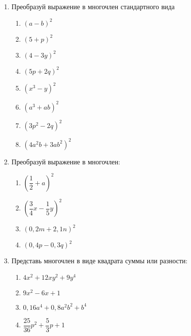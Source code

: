\documentclass[12pt, a4paper]{article}
\begin{document}
	
 \cfoot{}
\begin{enumerate}
	\item Преобразуй выражение в многочлен стандартного вида
	\begin{multicols}{2}
		\begin{enumerate}[label=\textbf{\arabic*)}]
			\item $(a-b)^2$
			\item $(5+p)^2$
			\item $(4-3y)^2$
			\item $(5p+2q)^2$
			\item $(x^3-y)^2$
			\item $(a^3+ab)^2$
			\item $(3p^2-2q)^2$
			\item $(4a^2b+3ab^2)^2$
		\end{enumerate}
	\end{multicols}
	\item Преобразуй выражение в многочлен:
	\begin{enumerate}[label=\textbf{\arabic*)}]
		\item $\left( \dfrac{1}{2}+a\right) ^2$
		\item $\left(\dfrac{3}{4}x-\dfrac{1}{5}y \right)^2 $
		\item $\left(0,2m+2,1n \right)^2 $
		\item $\left(0,4p-0,3q \right)^2 $
	\end{enumerate}
	\item Представь многочлен в виде квадрата суммы или разности:
	\begin{multicols}{2}
		\begin{enumerate}[label=\textbf{\arabic*)}]
			\item $4x^2+12xy^2+9y^4$
			\item $9x^2-6x+1$
			\item $0,16a^4+0,8a^2b^2+b^4$
			\item $\dfrac{25}{36}p^2+\dfrac{5}{3}p+1$
		\end{enumerate}
	\end{multicols}
\end{enumerate}
\end{document}
